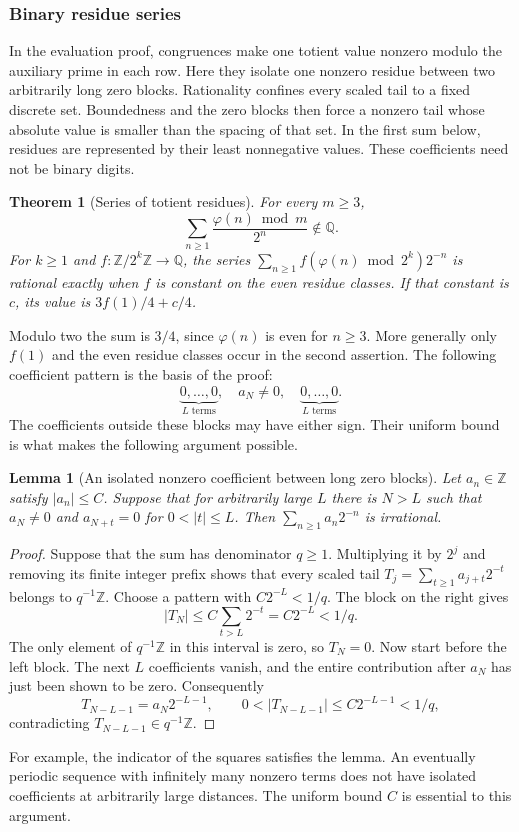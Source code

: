 \documentclass[11pt]{article}
\theoremstyle{plain}
\newtheorem{lem}[thm]{Lemma}
\newtheorem{theorem}[thm]{Theorem}
\theoremstyle{definition}
\theoremstyle{remark}
\newcommand{\Z}{\mathbb{Z}}
\newcommand{\Q}{\mathbb{Q}}
\newcommand{\ph}{\varphi}
\begin{document}
\subsubsection{Binary residue series}\label{sec:family}
In the evaluation proof, congruences make one totient value nonzero
modulo the auxiliary prime in each row. Here they isolate one nonzero
residue between two arbitrarily long zero blocks. Rationality confines
every scaled tail to a fixed discrete set. Boundedness and the zero
blocks then force a nonzero tail whose absolute value is smaller than
the spacing of that set.
In the first sum below, residues are represented by their least
nonnegative values. These coefficients need not be binary digits.
\begin{theorem}[Series of totient residues]\label{res:residueseries}
For every $m\ge3$,
\[
 \sum_{n\ge1}\frac{\ph(n)\bmod m}{2^n}\notin\Q.
\]
For $k\ge1$ and $f:\Z/2^k\Z\to\Q$, the series
$\sum_{n\ge1}f(\ph(n)\bmod2^k)2^{-n}$ is rational exactly when $f$ is
constant on the even residue classes. If that constant is $c$, its value is
$3f(1)/4+c/4$.
\end{theorem}
Modulo two the sum is $3/4$, since $\varphi(n)$ is even for $n\ge3$.
More generally only $f(1)$ and the even residue classes occur in the
second assertion. The following coefficient pattern is the basis of the proof:
\[
 \underbrace{0,\ldots,0}_{L\text{ terms}},\quad
 a_N\ne0,\quad
 \underbrace{0,\ldots,0}_{L\text{ terms}}.
\]
The coefficients outside these blocks may have either sign. Their
uniform bound is what makes the following argument possible.
\begin{lem}[An isolated nonzero coefficient between long zero blocks]\label{lem:bounded-pulse}
Let $a_n\in\Z$ satisfy $|a_n|\le C$. Suppose that for arbitrarily large $L$
there is $N>L$ such that $a_N\ne0$ and
$a_{N+t}=0$ for $0<|t|\le L$. Then $\sum_{n\ge1}a_n2^{-n}$ is irrational.
\end{lem}
\begin{proof}
Suppose that the sum has denominator $q\ge1$. Multiplying it by
$2^j$ and removing its finite integer prefix shows that every scaled
tail $T_j=\sum_{t\ge1}a_{j+t}2^{-t}$ belongs to $q^{-1}\Z$.
Choose a pattern with $C2^{-L}<1/q$. The block on the right gives
\[
 |T_N|\le C\sum_{t>L}2^{-t}=C2^{-L}<1/q.
\]
The only element of $q^{-1}\Z$ in this interval is zero, so $T_N=0$.
Now start before the left block. The next $L$ coefficients vanish,
and the entire contribution after $a_N$ has just been shown to be
zero. Consequently
\[
 T_{N-L-1}=a_N2^{-L-1},\qquad
 0<|T_{N-L-1}|\le C2^{-L-1}<1/q,
\]
contradicting $T_{N-L-1}\in q^{-1}\Z$.
\end{proof}
For example, the indicator of the squares satisfies the lemma.
An eventually periodic sequence with infinitely many nonzero terms
does not have isolated coefficients at arbitrarily large distances.
The uniform bound $C$ is essential to this argument.
\end{document}
